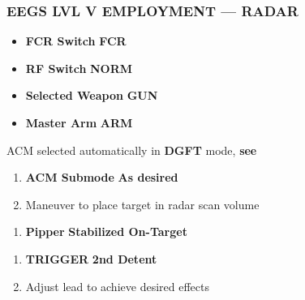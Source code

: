 

\clearpage

\subsubsection{EEGS LVL V EMPLOYMENT --- RADAR}
\label{subsec:m61:eegslvl5}
\begin{checklistenumerate}
    \blueitem[Prerequisites]
    \begin{itemize}
        \item \textbf{FCR Switch} \dotfill \textbf{FCR}
        \item \textbf{RF Switch} \dotfill \textbf{NORM}
        \item \textbf{Selected Weapon} \dotfill \textbf{GUN}
        \item \textbf{Master Arm} \dotfill \textbf{ARM}
    \end{itemize}
    ACM selected automatically in \textbf{DGFT} mode, \textbf{see }

    \begin{enumerate}
        \item \textbf{ACM Submode} \dotfill \textbf{As desired}
        \item Maneuver to place target in radar scan volume
    \end{enumerate}
    \begin{enumerate}
        \item \textbf{Pipper} \dotfill \textbf{Stabilized On-Target}
    \end{enumerate}
    \begin{enumerate}
        \item \textbf{TRIGGER} \dotfill \textbf{2nd Detent}
        \item Adjust lead to achieve desired effects
    \end{enumerate}
\end{checklistenumerate}

